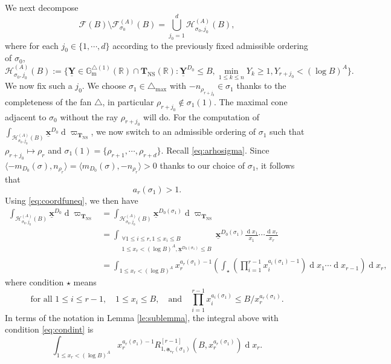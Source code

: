 \documentclass[11pt,letterpaper]{amsart}
\newcommand{\BG}{{\mathbb {G}}}
\newcommand{\BR}{{\mathbb {R}}}
\newcommand{\CF}{{\mathcal {F}}}
\newcommand{\CH}{{\mathcal {H}}}
\newcommand{\xx}{\underline{\mathbf{x}}}
\newcommand{\YY}{\underline{\mathbf{Y}}}
\renewcommand{\aa}{\underline{\mathbf{a}}}
\newcommand{\CTNS}{\mathbf{T}_{\operatorname{NS}}}
\theoremstyle{plain}
\numberwithin{equation}{section}
\theoremstyle{definition}
\theoremstyle{remark}
\begin{document}
	We next decompose $$\CF(B)\setminus\CF_{\sigma_0}^{(A)}(B)=\bigcup_{j_0=1}^d \CH_{\sigma_0,j_0}^{(A)}(B),$$ where for each $j_0\in\{1,\cdots,d\}$ according to the previously fixed admissible ordering of $\sigma_0$, $$\CH_{\sigma_0,j_0}^{(A)}(B):=\{\YY\in \BG_{\operatorname{m}}^{\triangle(1)}(\BR)\cap \CTNS(\BR):\YY^{D_0}\leqslant B,\min_{1\leqslant k\leqslant n}Y_k\geqslant 1, Y_{r+j_0}<(\log B)^A\}.$$
	We now fix such a $j_0$. We choose $\sigma_1\in\triangle_{\max}$ with $-n_{\rho_{r+j_0}}\in\sigma_1$ thanks to the completeness of the fan $\triangle$, in particular $\rho_{r+j_0}\not\in \sigma_1(1)$. The maximal cone adjacent to $\sigma_0$ without the ray $\rho_{r+j_0}$ will do.
	For the computation of $\int_{\CH_{\sigma_0,j_0}^{(A)}(B)}\xx^{D_0}\operatorname{d}\varpi_{\CTNS}$, we now switch to an admissible ordering of $\sigma_1$ such that $\rho_{r+j_0}\mapsto\rho_r$ and $\sigma_1(1)=\{\rho_{r+1},\cdots,\rho_{r+d}\}$. Recall \eqref{eq:arhosigma}. Since $\langle-m_{D_0}(\sigma),n_{\rho_r}\rangle=\langle m_{D_0}(\sigma),-n_{\rho_r}\rangle>0$ thanks to our choice of $\sigma_1$, it follows that $$a_r(\sigma_1)>1.$$ Using \eqref{eq:coordfuneq}, we then have
	\begin{align*}
		\int_{\CH_{\sigma_0,j_0}^{(A)}(B)}\xx^{D_0}\operatorname{d}\varpi_{\CTNS}&=\int_{\CH_{\sigma_0,j_0}^{(A)}(B)}\xx^{D_0(\sigma_1)}\operatorname{d}\varpi_{\CTNS}\\&=\int_{\substack{\forall 1\leqslant i\leqslant r,1\leqslant x_i\leqslant B\\ 1\leqslant x_r<(\log B)^A, \xx^{D_0(\sigma_1)}\leqslant B}} \xx^{D_0(\sigma_1)}\frac{\operatorname{d}x_1}{x_1}\cdots\frac{\operatorname{d}x_r}{x_r}\\
		&=\int_{1\leqslant x_r<(\log B)^A}x_r^{a_r(\sigma_1)-1}\left(\int_{\star}\left(\prod_{i=1}^{r-1}x_i^{a_i(\sigma_1)-1}\right)\operatorname{d}x_1\cdots\operatorname{d}x_{r-1}\right)\operatorname{d}x_r,
	\end{align*}
	where condition $\star$ means \begin{equation}\label{eq:condint}
		\text{for all } 1\leqslant i\leqslant r-1,\quad 1\leqslant x_i\leqslant B,\quad \text{and}\quad\prod_{i=1}^{r-1}x_i^{a_i(\sigma_1)}\leqslant B/x_r^{a_r(\sigma_1)}.
	\end{equation}
	In terms of the notation in Lemma \ref{le:sublemma}, the integral above with condition \eqref{eq:condint} is
	\begin{equation}\label{eq:intR}
		\int_{1\leqslant x_r<(\log B)^A}x_r^{a_r(\sigma_1)-1} R_{1,\aa_{*r}(\sigma_1)}^{[r-1]}(B,x_r^{a_r(\sigma_1)})\operatorname{d}x_r.
	\end{equation}
\end{document}
